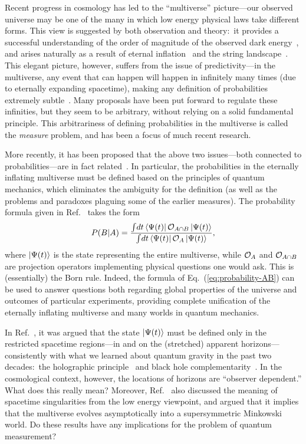 \documentclass[12pt]{article}
\begin{document}
Recent progress in cosmology has led to the ``multiverse'' picture---our 
observed universe may be one of the many in which low energy physical 
laws take different forms.  This view is suggested by both observation 
and theory:\ it provides a successful understanding of the order of 
magnitude of the observed dark energy~\cite{Weinberg:1987dv}, and 
arises naturally as a result of eternal inflation~\cite{Guth:1982pn} 
and the string landscape~\cite{Bousso:2000xa}.  This elegant picture, 
however, suffers from the issue of predictivity---in the multiverse, 
any event that can happen will happen in infinitely many times (due to 
eternally expanding spacetime), making any definition of probabilities 
extremely subtle~\cite{Guth:2000ka}.  Many proposals have been put 
forward to regulate these infinities, but they seem to be arbitrary, 
without relying on a solid fundamental principle.  This arbitrariness 
of defining probabilities in the multiverse is called the {\it measure} 
problem, and has been a focus of much recent research.

More recently, it has been proposed that the above two issues---both 
connected to probabilities---are in fact related~\cite{Nomura:2011dt}. 
In particular, the probabilities in the eternally inflating multiverse 
must be defined based on the principles of quantum mechanics, which 
eliminates the ambiguity for the definition (as well as the problems 
and paradoxes plaguing some of the earlier measures).  The probability 
formula given in Ref.~\cite{Nomura:2011dt} takes the form
%
\begin{equation}
  P(B|A) = \frac{\int\!dt \bra{\Psi(t)} {\cal O}_{A \cap B} \ket{\Psi(t)}} 
    {\int\!dt \bra{\Psi(t)} {\cal O}_A \ket{\Psi(t)}},
\label{eq:probability-AB}
\end{equation}
%
where $\left| \Psi(t) \right>$ is the state representing the entire multiverse, 
while ${\cal O}_A$ and ${\cal O}_{A \cap B}$ are projection operators 
implementing physical questions one would ask.  This is (essentially) 
the Born rule.  Indeed, the formula of Eq.~(\ref{eq:probability-AB}) 
can be used to answer questions both regarding global properties of 
the universe and outcomes of particular experiments, providing complete 
unification of the eternally inflating multiverse and many worlds 
in quantum mechanics.

In Ref.~\cite{Nomura:2011dt}, it was argued that the state $\left| \Psi(t) \right>$ 
must be defined only in the restricted spacetime regions---in 
and on the (stretched) apparent horizons---consistently with 
what we learned about quantum gravity in the past two decades:\ 
the holographic principle~\cite{'tHooft:1993gx} and black hole 
complementarity~\cite{Susskind:1993if}.  In the cosmological context, 
however, the locations of horizons are ``observer dependent.''  What 
does this really mean?  Moreover, Ref.~\cite{Nomura:2011dt} also discussed 
the meaning of spacetime singularities from the low energy viewpoint, 
and argued that it implies that the multiverse evolves asymptotically 
into a supersymmetric Minkowski world.  Do these results have any 
implications for the problem of quantum measurement?
\end{document}
